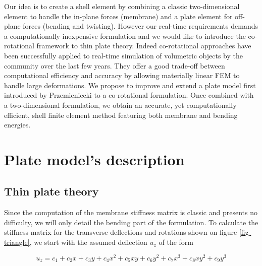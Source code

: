 \documentclass{llncs}
\begin{document}
Our idea is to create a shell element by combining a classic two-dimensional element to handle the in-plane forces (membrane) and a plate element for off-plane forces (bending and twisting). However our real-time requirements demands a computationally inexpensive formulation and we would like to introduce the co-rotational framework to thin plate theory. Indeed co-rotational approaches have been successfully applied to real-time simulation of volumetric objects by the community over the last few years. They offer a good trade-off between computational efficiency and accuracy by allowing materially linear FEM to handle large deformations. We propose to improve and extend a plate model first introduced by Przemieniecki \cite{Przemieniecki68} to a co-rotational formulation. Once combined with a two-dimensional formulation, we obtain an accurate, yet computationally efficient, shell finite element method featuring both membrane and bending energies. 


\section{Plate model's description}

\subsection{Thin plate theory}

Since the computation of the membrane stiffness matrix is classic and presents no difficulty, we will only detail the bending part of the formulation. To calculate the stiffness matrix for the transverse deflections and rotations shown on figure \ref{fig-triangle}, we start with the assumed deflection $u_z$ of the form

\begin{equation}
 u_z = c_1 + c_2x + c_3y + c_4x^2 + c_5xy + c_6y^2 + c_7x^3 + c_8xy^2 + c_9y^3
\label{eq-deflection}
\end{equation} 
\end{document}
